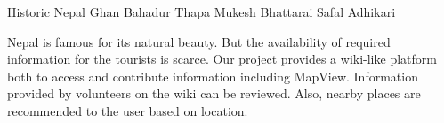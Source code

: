  \begin{conf-abstract}[]
 {Historic Nepal }
 {Ghan Bahadur Thapa
 	Mukesh Bhattarai
 	Safal Adhikari
 }
{}

Nepal is famous for its natural beauty. But the availability of required information for the tourists is scarce. Our project provides a wiki-like platform both to access and contribute information including MapView. Information provided by volunteers on the wiki can be reviewed. Also, nearby places are recommended to the user based on location.
 \end{conf-abstract}